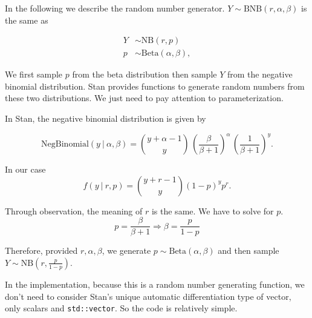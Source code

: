 \documentclass[11pt]{article}
\begin{document}
In the following we describe the random number generator. $Y \sim \text{BNB}(r,\alpha,\beta)$ is the same as

\begin{equation*}
  \begin{aligned}
  Y &\sim \text{NB}(r,p) \\
  p &\sim {\textrm {Beta}}(\alpha ,\beta ),
  \end{aligned}
\end{equation*}

We first sample $p$ from the beta distribution then sample $Y$ from the negative binomial distribution. Stan provides functions to generate random numbers from these two distributions. We just need to pay attention to parameterization.

In Stan, the negative binomial distribution is given by

\begin{equation}
\text{NegBinomial}(y~|~\alpha,\beta)  = \binom{y +
\alpha - 1}{y} \, \left( \frac{\beta}{\beta+1}
\right)^{\!\alpha} \, \left( \frac{1}{\beta + 1} \right)^{\!y} \!.
\end{equation}

In our case
\begin{equation}
f(y~|~r,p)  = \binom {y+r-1}{y} (1-p)^{y} p^{r}.
\end{equation}

Through observation, the meaning of $r$ is the same. We have to solve for $p$.
\begin{equation}
	p = \frac{\beta}{\beta+1} \Rightarrow \beta = \frac{p}{1-p}
\end{equation}

Therefore, provided $r, \alpha, \beta$, we generate $ p \sim {\textrm {Beta}}(\alpha ,\beta )$ and then sample $Y \sim \text{NB}(r, \frac{p}{1-p})$.


In the implementation, because this is a random number generating function, we don't need to consider Stan's unique automatic differentiation type of vector, only scalars and \verb|std::vector|. So the code is relatively simple.
\end{document}
